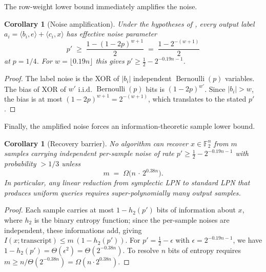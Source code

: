\documentclass[11pt,a4paper]{article}
\theoremstyle{plain}
\newtheorem{corollary}[theorem]{Corollary}
\theoremstyle{definition}
\newcommand{\F}{\mathbb{F}}
\begin{document}
The row-weight lower bound immediately amplifies the noise.

\begin{corollary}[Noise amplification]
\label{cor:noise-amp}
Under the hypotheses of , every output label $a_i=\langle b_i,e\rangle+\langle c_i,x\rangle$ has effective noise parameter
\[
p' \;\ge\; \frac{1-(1-2p)^{w+1}}{2} \;=\; \frac{1-2^{-(w+1)}}{2}
\]
at $p=1/4$.  For $w=\lfloor 0.19n\rfloor$ this gives $p'\ge \tfrac12-2^{-0.19n-1}$.
\end{corollary}

\begin{proof}
The label noise is the XOR of $|b_i|$ independent $\operatorname{Bernoulli}(p)$ variables.  The bias of XOR of $w'$ i.i.d. $\operatorname{Bernoulli}(p)$ bits is $(1-2p)^{w'}$.  Since $|b_i|>w$, the bias is at most $(1-2p)^{w+1}=2^{-(w+1)}$, which translates to the stated $p'$.
\end{proof}

Finally, the amplified noise forces an information-theoretic sample lower bound.

\begin{corollary}[Recovery barrier]
\label{cor:recovery-barrier}
No algorithm can recover $x\in\F_2^{n}$ from $m$ samples carrying \emph{independent} per-sample noise of rate $p'\ge \tfrac12-2^{-0.19n-1}$ with probability $>1/3$ unless
\[
m \;=\; \Omega\bigl(n\,\cdot\,2^{0.38n}\bigr).
\]
In particular, any linear reduction from symplectic LPN to standard LPN that produces uniform queries requires super-polynomially many output samples.
\end{corollary}

\begin{proof}
Each sample carries at most $1-h_2(p')$ bits of information about $x$, where $h_2$ is the binary entropy function; since the per-sample noises are independent, these informations add, giving $I(x;\text{transcript})\le m\,(1-h_2(p'))$.  For $p'=\tfrac12-\epsilon$ with $\epsilon=2^{-0.19n-1}$, we have $1-h_2(p')=\Theta(\epsilon^2)=\Theta(2^{-0.38n})$.  To resolve $n$ bits of entropy requires $m\ge n/\Theta(2^{-0.38n})=\Omega(n\cdot 2^{0.38n})$.
\end{proof}
\end{document}
